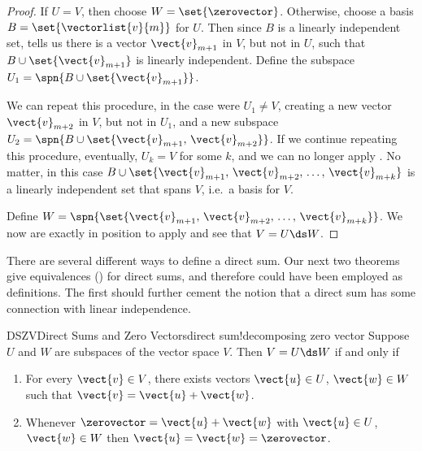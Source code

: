 \begin{proof}
If $U=V$, then choose $W=\set{\zerovector}$.  Otherwise, choose a basis $B=\set{\vectorlist{v}{m}}$ for $U$.  Then since $B$ is a linearly independent set,  tells us there is a vector $\vect{v}_{m+1}$ in $V$, but not in $U$, such that $B\cup\set{\vect{v}_{m+1}}$ is linearly independent.  Define the subspace $U_1=\spn{B\cup\set{\vect{v}_{m+1}}}$.\par
%
We can repeat this procedure, in the case were $U_1\neq V$, creating a new vector $\vect{v}_{m+2}$ in $V$, but not in $U_1$, and a new subspace $U_2=\spn{B\cup\set{\vect{v}_{m+1},\,\vect{v}_{m+2}}}$.  If we continue repeating this procedure, eventually, $U_k=V$ for some $k$, and we can no longer apply .  No matter, in this case $B\cup\set{\vect{v}_{m+1},\,\vect{v}_{m+2},\,\dots,\,\vect{v}_{m+k}}$ is a linearly independent set that spans $V$, i.e.\ a basis for $V$.\par
%
Define $W=\spn{\set{\vect{v}_{m+1},\,\vect{v}_{m+2},\,\dots,\,\vect{v}_{m+k}}}$.  We now are exactly in position to apply  and see that $V=U\ds W$.
\end{proof}
%
There are several different ways to define a direct sum.  Our next two theorems give equivalences () for direct sums, and therefore could have been employed as definitions.  The first should further cement the notion that a direct sum has some connection with linear independence.
%
\begin{theorem}{DSZV}{Direct Sums and Zero Vectors}{direct sum!decomposing zero vector}
Suppose $U$ and $W$ are subspaces of the vector space $V$.  Then $V=U\ds W$ if and only if
\begin{enumerate}
\item  For every $\vect{v}\in V$, there exists vectors $\vect{u}\in U$, $\vect{w}\in W$ such that $\vect{v}=\vect{u}+\vect{w}$.
%
\item Whenever $\zerovector=\vect{u}+\vect{w}$ with $\vect{u}\in U$, $\vect{w}\in W$ then $\vect{u}=\vect{w}=\zerovector$.
\end{enumerate}
\end{theorem}
%

